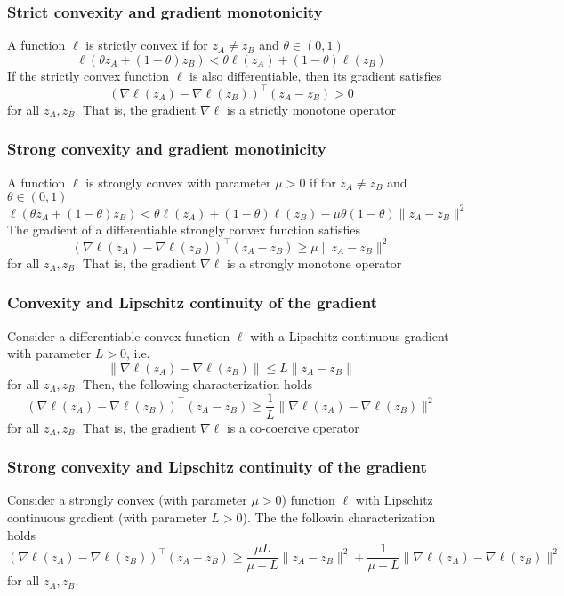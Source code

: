 \documentclass{book}
\theoremstyle{theoremv2}
\theoremstyle{defv2}
\theoremstyle{remark}
\theoremstyle{remark}
\theoremstyle{definition}
\theoremstyle{definition}
\begin{document}
\subsubsection{Strict convexity and gradient monotonicity}
A function $\ell$ is strictly convex if for $z_A\neq z_B$ and $\theta\in (0,1)$ 
\[
    \ell(\theta z_A + (1-\theta)z_B)<\theta\ell(z_A)+(1-\theta)\ell(z_B)
\]
If the strictly convex function $\ell$ is also differentiable, then its gradient satisfies 
\[
    \left(\nabla\ell(z_A)-\nabla\ell(z_B)\right)^\top (z_A-z_B)>0
\]
for all $z_A,z_B$. That is, the gradient $\nabla\ell$ is a strictly monotone operator
\subsubsection{Strong convexity and gradient monotinicity}
A function $\ell$ is strongly convex with parameter $\mu>0$ if for $z_A\neq z_B$ and $\theta\in(0,1)$
\[
    \ell(\theta z_A + (1-\theta)z_B)<\theta\ell(z_A)+(1-\theta)\ell(z_B) - \mu\theta(1-\theta)\|z_A-z_B\|^2
\]
The gradient of a differentiable strongly convex function satisfies 
\[
    \left(\nabla\ell(z_A)-\nabla\ell(z_B)\right)^\top (z_A-z_B)\geq \mu\|z_A-z_B\|^2
\]
for all $z_A,z_B$. That is, the gradient $\nabla\ell$ is a strongly monotone operator

\subsubsection{Convexity and Lipschitz continuity of the gradient}
Consider a differentiable convex function $\ell$ with a Lipschitz continuous gradient with parameter $L>0$, i.e.
\[
    \|\nabla \ell(z_A)- \nabla\ell (z_B)\| \leq L\|z_A-z_B\|
\]
for all $z_A,z_B$.
Then, the following characterization holds
\[
    \left(\nabla\ell(z_A)-\nabla\ell(z_B)\right)^\top (z_A-z_B)\geq \displaystyle\frac{1}{L}\|\nabla\ell(z_A)-\nabla\ell(z_B)\|^2
\]
for all $z_A,z_B$. That is, the gradient $\nabla\ell$ is a co-coercive operator

\subsubsection{Strong convexity and Lipschitz continuity of the gradient}
Consider a strongly convex (with parameter $\mu>0$) function $\ell$ with Lipschitz continuous gradient (with parameter $L>0$). The the followin characterization holds 
\[
    \left(\nabla\ell(z_A)-\nabla\ell(z_B)\right)^\top (z_A-z_B)\geq \displaystyle\frac{\mu L }{\mu + L} \|z_A - z_B\|^2 + \displaystyle\frac{1}{\mu + L}\|\nabla\ell(z_A)-\nabla\ell(z_B)\|^2
\]
for all $z_A,z_B$.
\end{document}
